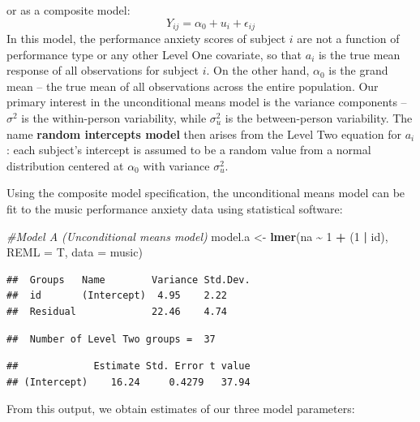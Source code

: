 \documentclass[
]{krantz}
\newenvironment{Shaded}{\begin{snugshade}}{\end{snugshade}}
\newcommand{\AttributeTok}[1]{\textcolor[rgb]{0.27,0.27,0.27}{#1}}
\newcommand{\CommentTok}[1]{\textcolor[rgb]{0.37,0.37,0.37}{\textit{#1}}}
\newcommand{\DecValTok}[1]{\textcolor[rgb]{0.06,0.06,0.06}{#1}}
\newcommand{\FunctionTok}[1]{\textcolor[rgb]{0.27,0.27,0.27}{\textbf{#1}}}
\newcommand{\NormalTok}[1]{#1}
\newcommand{\OtherTok}[1]{\textcolor[rgb]{0.37,0.37,0.37}{#1}}
\newcommand{\SpecialCharTok}[1]{\textcolor[rgb]{0.43,0.43,0.43}{\textbf{#1}}}
\begin{document}
or as a composite model:
\begin{equation*}
Y_{ij}=\alpha_{0}+u_{i}+\epsilon_{ij}
\end{equation*}
In this model, the performance anxiety scores of subject \(i\) are not a function of performance type or any other Level One covariate, so that \(a_{i}\) is the true mean response of all observations for subject \(i\). On the other hand, \(\alpha_{0}\) is the grand mean -- the true mean of all observations across the entire population. Our primary interest in the unconditional means model is the variance components -- \(\sigma^2\) is the within-person variability, while \(\sigma_{u}^{2}\) is the between-person variability. The name \textbf{random intercepts model} then arises from the Level Two equation for \(a_{i}\): each subject's intercept is assumed to be a random value from a normal distribution centered at \(\alpha_{0}\) with variance \(\sigma_{u}^{2}\).

Using the composite model specification, the unconditional means model can be fit to the music performance anxiety data using statistical software:

\begin{Shaded}
\begin{Highlighting}[]
\CommentTok{\#Model A (Unconditional means model)}
\NormalTok{model.a }\OtherTok{\textless{}{-}} \FunctionTok{lmer}\NormalTok{(na }\SpecialCharTok{\textasciitilde{}} \DecValTok{1} \SpecialCharTok{+}\NormalTok{ (}\DecValTok{1} \SpecialCharTok{|}\NormalTok{ id), }\AttributeTok{REML =}\NormalTok{ T, }\AttributeTok{data =}\NormalTok{ music)}
\end{Highlighting}
\end{Shaded}

\begin{verbatim}
##  Groups   Name        Variance Std.Dev.
##  id       (Intercept)  4.95    2.22    
##  Residual             22.46    4.74
\end{verbatim}

\begin{verbatim}
##  Number of Level Two groups =  37
\end{verbatim}

\begin{verbatim}
##             Estimate Std. Error t value
## (Intercept)    16.24     0.4279   37.94
\end{verbatim}

From this output, we obtain estimates of our three model parameters:
\end{document}
